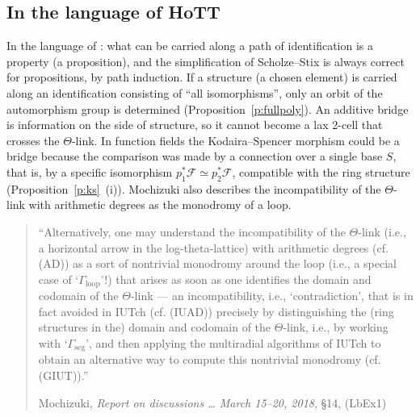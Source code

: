 \documentclass[11pt,a4paper]{article}
\numberwithin{table}{section}
\newcommand{\Fcal}{\mathcal{F}}
\newcommand{\lab}[2]{{\upshape\fcolorbox{#1}{#1!8}{\scriptsize\sffamily\bfseries\textcolor{#1}{#2}}}}
\newcommand{\tagS}{\lab{blue}{S}}
\newcommand{\tagH}{\lab{BurntOrange}{H}}
\newcommand{\q}[1]{``#1''}
\newcommand{\srcquote}[2]{\begin{quote}\small #1\par\nopagebreak\hfill{\footnotesize #2}\end{quote}}
\theoremstyle{plain}
\theoremstyle{definition}
\begin{document}
\subsection{In the language of HoTT}
\tagH{} In the language of \cite{SL}: what can be carried along a path of identification is a property (a
proposition), and the simplification of Scholze--Stix is always correct for propositions, by path induction. If a
structure (a chosen element) is carried along an identification consisting of ``all isomorphisms'', only an orbit of
the automorphism group is determined (Proposition~\ref{p:fullpoly}). An additive bridge is information on the side of
structure, so it cannot become a lax 2-cell that crosses the $\Theta$-link. In function fields the Kodaira--Spencer
morphism could be a bridge because the comparison was made by a connection over a single base $S$, that is, by a
specific isomorphism $p_1^*\Fcal\simeq p_2^*\Fcal$, compatible with the ring structure (Proposition~\ref{p:ks}~(i)).
Mochizuki also describes the incompatibility of the $\Theta$-link with arithmetic degrees as the monodromy of a loop.
\srcquote{\tagS{} \q{Alternatively, one may understand the incompatibility of the $\Theta$-link (i.e., a horizontal
arrow in the log-theta-lattice) with arithmetic degrees (cf. (AD)) as a sort of nontrivial monodromy around the loop
(i.e., a special case of `$\Gamma_{\mathrm{loop}}$'!) that arises as soon as one identifies the domain and codomain
of the $\Theta$-link --- an incompatibility, i.e., `contradiction', that is in fact avoided in IUTch (cf. (IUAD))
precisely by distinguishing the (ring structures in the) domain and codomain of the $\Theta$-link, i.e.,
by working with `$\Gamma_{\mathrm{seg}}$', and then applying the multiradial algorithms of IUTch to obtain an
alternative way to compute this nontrivial monodromy (cf. (GIUT)).}}{Mochizuki, \emph{Report on discussions \dots{}
March 15--20, 2018}, \S14, (LbEx1) \cite{R18}}
\end{document}
